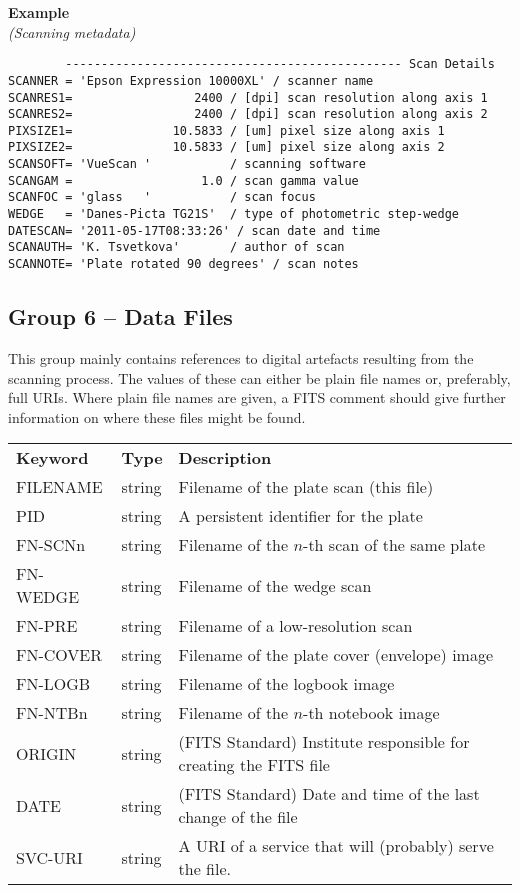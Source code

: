 \documentclass[11pt]{ivoa}
\newenvironment{fitsexample}[1]
{\bigskip\noindent\textbf{Example}\\\textit{(#1)\smallskip}}
{\medskip}
\begin{document}
\begin{fitsexample}{Scanning metadata}
\begin{lstlisting}
        ----------------------------------------------- Scan Details
SCANNER = 'Epson Expression 10000XL' / scanner name
SCANRES1=                 2400 / [dpi] scan resolution along axis 1
SCANRES2=                 2400 / [dpi] scan resolution along axis 2
PIXSIZE1=              10.5833 / [um] pixel size along axis 1
PIXSIZE2=              10.5833 / [um] pixel size along axis 2
SCANSOFT= 'VueScan '           / scanning software
SCANGAM =                  1.0 / scan gamma value
SCANFOC = 'glass   '           / scan focus
WEDGE   = 'Danes-Picta TG21S'  / type of photometric step-wedge
DATESCAN= '2011-05-17T08:33:26' / scan date and time
SCANAUTH= 'K. Tsvetkova'       / author of scan
SCANNOTE= 'Plate rotated 90 degrees' / scan notes
\end{lstlisting}
\end{fitsexample}


\subsection{Group 6 – Data Files}

This group mainly contains references to digital artefacts resulting
from the scanning process.  The values of these can either be plain file
names or, preferably, full URIs.  Where plain file names are given, a
FITS comment should give further information on where these files might
be found.

\begin{inlinetable}
\footnotesize
\begin{tabular}{llp{}}
\sptablerule
\textbf{Keyword}&\textbf{Type}&\textbf{Description}\\
\sptablerule
FILENAME &string    &Filename of the plate scan (this file)\\
PID      &string    &A persistent identifier for the plate\\
FN-SCNn  &string    &
  Filename of the $n$-th scan of the same plate\\
FN-WEDGE &string    &Filename of the wedge scan\\
FN-PRE   &string    &
  Filename of a low-resolution scan\\
FN-COVER &string    &
  Filename of the plate cover (envelope) image\\
FN-LOGB  &string    &Filename of the logbook image\\
FN-NTBn  &string    &
  Filename of the $n$-th notebook image\\
ORIGIN   &string    &
  (FITS Standard) Institute responsible for creating the FITS file\\
DATE     &string    &
  (FITS Standard) Date and time of the last change of the file \\
SVC-URI  &string    &
  A URI of a service that will (probably) serve the file.\\
\end{tabular}
\end{inlinetable}
\end{document}
